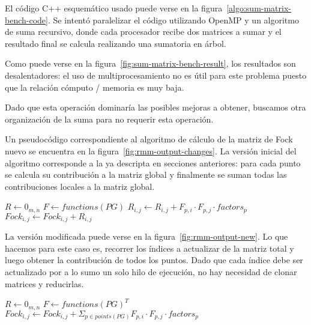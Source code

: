 El c\'odigo C++ esquem\'atico usado puede verse en la figura~\ref{algo:sum-matrix-bench-code}.
Se intent\'o paralelizar el c\'odigo utilizando OpenMP y un algoritmo de suma recursivo,
donde cada procesador recibe dos matrices a sumar y el resultado final se calcula
realizando una sumatoria en \'arbol.

Como puede verse en la figura~\ref{fig:sum-matrix-bench-result}, los resultados
son desalentadores: el uso de multiprocesamiento no es \'util para este problema
puesto que la relaci\'on c\'omputo / memoria es muy baja. 

Dado que esta operaci\'on dominar\'ia las posibles mejoras a obtener, buscamos
otra organizaci\'on de la suma para no requerir esta operaci\'on.

Un pseudoc\'odigo correspondiente al algoritmo de c\'alculo de la matriz de Fock
nuevo se encuentra en la figura~\ref{fig:rmm-output-changes}. La versi\'on 
inicial del algoritmo corresponde a la ya descripta en secciones anteriores: para
cada punto se calcula su contribuci\'on a la matriz global y finalmente se suman
todas las contribuciones locales a la matriz global.

\begin{algorithm}[H]
    \centering
    \label{algo:rmm-output-previous}
    \begin{algorithmic}
        \State $R \gets 0_{m,n}$
        \State $F \gets functions(PG)$
            \State $R_{i,j} \gets R_{i,j} + F_{p,i} \cdot F_{p,j} \cdot factors_{p}$
            \EndFor
        \EndFor
            \State $Fock_{i,j} \gets Fock_{i,j} + R_{i,j}$
        \EndFor
    \end{algorithmic}
\end{algorithm}

La versi\'on modificada puede verse en la figura~\ref{fig:rmm-output-new}. Lo que
hacemos para este caso es, recorrer los \'indices a actualizar de la matriz total
y luego obtener la contribuci\'on de todos los puntos. Dado que cada \'indice debe
ser actualizado por a lo sumo un solo hilo de ejecuci\'on, no hay necesidad de
clonar matrices y reducirlas.

\begin{algorithm}[H]
    \centering
    \label{algo:rmm-output-new}
    \begin{algorithmic}
        \State $R \gets 0_{m,n}$
        \State $F \gets functions(PG)^T$
            \State $Fock_{i,j} \gets Fock_{i,j} + \displaystyle \Sigma_{p \in points(PG)} F_{p,i} \cdot F_{p,j} \cdot factors_{p}$
        \EndFor
    \end{algorithmic}
\end{algorithm}

